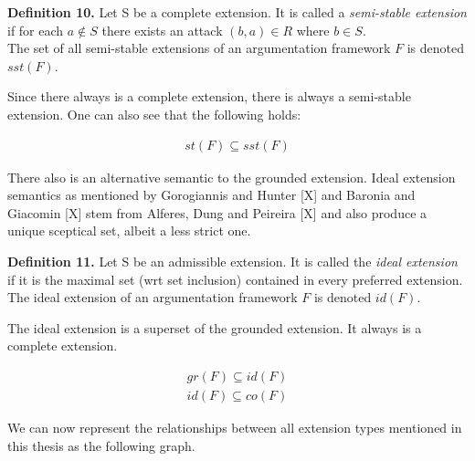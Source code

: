 \documentclass[draft,final]{vutinfth} %
\newcommand{\hl}{\par\vspace{6pt}} %
\newcommand{\cl}{\par\vspace{12pt}} %
\begin{document}
\textbf{Definition 10.} Let S be a complete extension. It is called a \emph{semi-stable extension} if for each $a\not\in S$ there exists an attack $(b,a)\in R$ where $b\in S$.\\ %
The set of all semi-stable extensions of an argumentation framework $F$ is denoted $sst(F)$.\hl

Since there always is a complete extension, there is always a semi-stable extension. One can also see that the following holds:

\begin{align}
	st(F)\subseteq sst(F)
\end{align}\cl


There also is an alternative semantic to the grounded extension. Ideal extension semantics as mentioned by Gorogiannis and Hunter [X] and Baronia and Giacomin [X] stem from Alferes, Dung and Peireira [X] and also produce a unique sceptical set, albeit a less strict one.\hl

 \textbf{Definition 11.} Let S be an admissible extension. It is called the \emph{ideal extension} if it is the maximal set (wrt set inclusion) contained in every preferred extension.\\
 The ideal extension of an argumentation framework $F$ is denoted $id(F)$.\hl


The ideal extension is a superset of the grounded extension. It always is a complete extension.

\begin{align}
	gr(F)\subseteq id(F)\\ %
	id(F)\subseteq co(F) %
\end{align}\cl


We can now represent the relationships between all extension types mentioned in this thesis as the following graph.\hl
\end{document}
